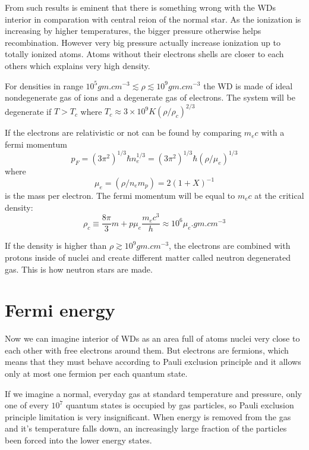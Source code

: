 \documentclass[oneside,a4paper,11pt]{report}
\begin{document}
From such results is eminent that there is something wrong with the WDs interior in comparation with central reion of the 
normal star. As the ionization is increasing by higher temperatures, the bigger pressure otherwise helps recombination. However 
very big pressure actually increase ionization up to totally ionized atoms. Atoms without their 
electrons shells are closer to each others which explains very high density.

For densities in range $10^5 gm.cm^{-3} \lesssim \rho \lesssim 10^9 gm.cm^{-3}$ the WD is made 
of ideal nondegenerate gas of ions and a degenerate gas of electrons. The system will be degenerate 
if $T>T_c$ where $T_c \approx 3 \times 10^9 K (\rho / \rho_c)^{2/3} $ 

If the electrons are relativistic or not can be found by comparing $m_e c$ with a fermi momentum
\begin{equation}
 p_F = (3\pi^2)^{1/3}\hbar n_e^{1/3} = (3\pi^2)^{1/3}\hbar (\rho/\mu_e)^{1/3}
\end{equation}
 where 
\begin{equation}
 \mu_e = (\rho / n_e m_p) = 2(1+X)^{-1}
\end{equation}
is the mass per electron. The fermi momentum will be equal to $m_e c$ at the critical density:
\begin{equation}
\rho_c \equiv \frac{8\pi}{3}m+p \mu_e \frac{m_ec^3}{h} \approx 10^6 \mu_e.gm.cm^{-3}
\end{equation}

If the density is higher than $\rho \gtrsim 10^9 gm.cm^{-3} $, the electrons are combined with protons inside of nuclei and 
create different matter called neutron degenerated gas. This is how neutron stars are made.    
 
\section{Fermi energy}
Now we can imagine interior of WDs as an area full of atoms nuclei very close to each other 
with free electrons around them. But electrons are fermions, which means that they must 
behave according to Pauli exclusion principle and it allows only at most one fermion 
per each quantum state. 

If we imagine a normal, everyday gas at standard temperature and pressure, only one 
of every $10^7$ quantum states is occupied by gas particles, so Pauli exclusion 
principle limitation is very insignificant. When energy is removed from the gas and 
it's temperature falls down, an increasingly large fraction of  the particles been 
forced into the lower energy states.
\end{document}
